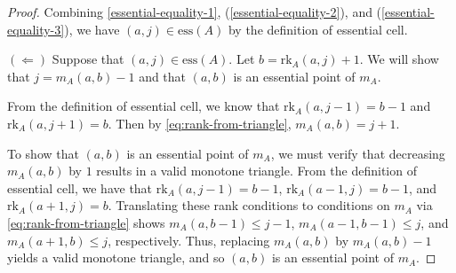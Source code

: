\documentclass[10pt,a4paper]{amsart}
\newcommand{\ess}{\mathrm{ess}}
\newcommand{\rk}{\mathrm{rk}}
\begin{document}
\begin{proof}
Combining \cref{essential-equality-1}, (\ref{essential-equality-2}), and (\ref{essential-equality-3}), we have $(a,j) \in \ess(A)$ by the definition of essential cell.

\noindent $(\Leftarrow)$ Suppose that $(a,j)\in \ess(A)$. Let $b=\rk_A(a,j)+1$. We will show that $j=m_A(a,b)-1$ and that $(a,b)$ is an essential point of $m_A$.  

From the definition of essential cell, we know that $\rk_A(a,j-1)=b-1$ and $\rk_A(a,j+1)=b$.  Then by \cref{eq:rank-from-triangle}, $m_A(a,b)=j+1$.  

To show that $(a,b)$ is an essential point of $m_A$, we must verify that decreasing $m_A(a,b)$ by $1$ results in a valid monotone triangle.  From the definition of essential cell, we have that $\rk_A(a,j-1)=b-1$, $\rk_A(a-1,j)=b-1$, and $\rk_A(a+1,j)=b$.  Translating these rank conditions to conditions on $m_A$ via \cref{eq:rank-from-triangle} shows $m_A(a,b-1)\leq j-1$, $m_A(a-1,b-1)\leq j$, and $m_A(a+1,b)\leq j$, respectively. Thus, replacing $m_A(a,b)$ by $m_A(a,b)-1$ yields a valid monotone triangle, and so $(a,b)$ is an essential point of $m_A$.
\end{proof}
\end{document}
